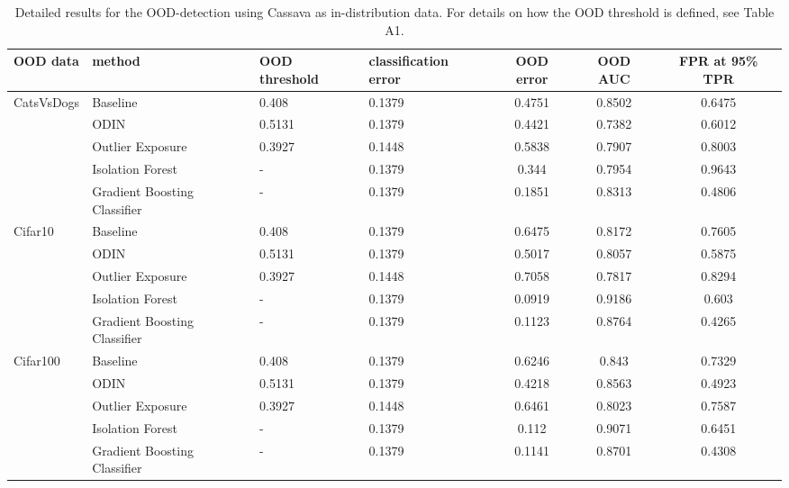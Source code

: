 \documentclass{article}
\begin{document}
 \begin{table}[h]
    \centering
    \caption{Detailed results for the OOD-detection using Cassava as in-distribution data. For details on how the OOD threshold is defined, see Table A1.}
\begin{tabular}{lllHccc}
\toprule
            OOD data & method                              & OOD threshold & classification error & OOD error & OOD AUC & FPR at 95\% TPR \\
\toprule
CatsVsDogs & Baseline &         0.408 &               0.1379 &    0.4751 &  0.8502 &         0.6475 \\
            & ODIN &        0.5131 &               0.1379 &    0.4421 &  0.7382 &         0.6012 \\
            & Outlier Exposure &        0.3927 &               0.1448 &    0.5838 &  0.7907 &         0.8003 \\
            & Isolation Forest &             - &               0.1379 &     0.344 &  0.7954 &         0.9643 \\
            & Gradient Boosting Classifier &             - &               0.1379 &    0.1851 &  0.8313 &         0.4806 \\
\midrule
Cifar10 & Baseline &         0.408 &               0.1379 &    0.6475 &  0.8172 &         0.7605 \\
            & ODIN &        0.5131 &               0.1379 &    0.5017 &  0.8057 &         0.5875 \\
            & Outlier Exposure &        0.3927 &               0.1448 &    0.7058 &  0.7817 &         0.8294 \\
            & Isolation Forest &             - &               0.1379 &    0.0919 &  0.9186 &          0.603 \\
            & Gradient Boosting Classifier &             - &               0.1379 &    0.1123 &  0.8764 &         0.4265 \\
\midrule
Cifar100 & Baseline &         0.408 &               0.1379 &    0.6246 &   0.843 &         0.7329 \\
            & ODIN &        0.5131 &               0.1379 &    0.4218 &  0.8563 &         0.4923 \\
            & Outlier Exposure &        0.3927 &               0.1448 &    0.6461 &  0.8023 &         0.7587 \\
            & Isolation Forest &             - &               0.1379 &     0.112 &  0.9071 &         0.6451 \\
            & Gradient Boosting Classifier &             - &               0.1379 &    0.1141 &  0.8701 &         0.4308 \\

\end{tabular}
\end{table}
\end{document}
